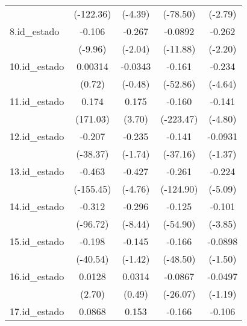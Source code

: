 {\begin{tabular}{l*{4}{c}}
            &   (-122.36)         &     (-4.39)         &    (-78.50)         &     (-2.79)         \\
[1em]
8.id\_estado &      -0.106\sym{***}&      -0.267         &     -0.0892\sym{***}&      -0.262\sym{*}  \\
            &     (-9.96)         &     (-2.04)         &    (-11.88)         &     (-2.20)         \\
[1em]
10.id\_estado&     0.00314         &     -0.0343         &      -0.161\sym{***}&      -0.234\sym{***}\\
            &      (0.72)         &     (-0.48)         &    (-52.86)         &     (-4.64)         \\
[1em]
11.id\_estado&       0.174\sym{***}&       0.175\sym{***}&      -0.160\sym{***}&      -0.141\sym{***}\\
            &    (171.03)         &      (3.70)         &   (-223.47)         &     (-4.80)         \\
[1em]
12.id\_estado&      -0.207\sym{***}&      -0.235         &      -0.141\sym{***}&     -0.0931         \\
            &    (-38.37)         &     (-1.74)         &    (-37.16)         &     (-1.37)         \\
[1em]
13.id\_estado&      -0.463\sym{***}&      -0.427\sym{***}&      -0.261\sym{***}&      -0.224\sym{***}\\
            &   (-155.45)         &     (-4.76)         &   (-124.90)         &     (-5.09)         \\
[1em]
14.id\_estado&      -0.312\sym{***}&      -0.296\sym{***}&      -0.125\sym{***}&      -0.101\sym{***}\\
            &    (-96.72)         &     (-8.44)         &    (-54.90)         &     (-3.85)         \\
[1em]
15.id\_estado&      -0.198\sym{***}&      -0.145         &      -0.166\sym{***}&     -0.0898         \\
            &    (-40.54)         &     (-1.42)         &    (-48.50)         &     (-1.50)         \\
[1em]
16.id\_estado&      0.0128\sym{*}  &      0.0314         &     -0.0867\sym{***}&     -0.0497         \\
            &      (2.70)         &      (0.49)         &    (-26.07)         &     (-1.19)         \\
[1em]
17.id\_estado&      0.0868\sym{***}&       0.153         &      -0.166\sym{***}&      -0.106         \\

\end{tabular}}
